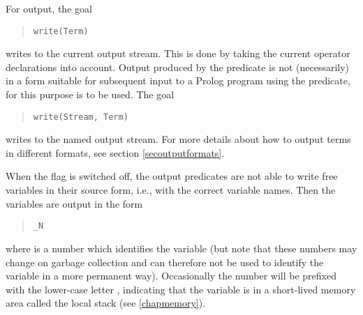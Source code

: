 For output, the goal
\begin{quote}
\begin{verbatim}
write(Term)
\end{verbatim}
\end{quote}
writes  to the current output stream.
This is done by taking the current operator declarations into account. Output
produced by the
%
predicate is not (necessarily) in
a form suitable for subsequent input to a Prolog program using the
predicate, for this purpose
%
is to be used.
The goal
\begin{quote}
\begin{verbatim}
write(Stream, Term)
\end{verbatim}
\end{quote}
writes  to the named output stream.
For more details about how to output terms in different formats, see
section \ref{secoutputformats}.



When the flag  is switched off,
the output predicates are not able to write free variables
in their source form, i.e., with the correct variable names.
Then the variables are output in the form
\begin{quote}
\begin{verbatim}
_N
\end{verbatim}
\end{quote}
where  is a number which identifies the variable (but note that these
numbers may change on garbage collection and can therefore not be used to
identify the variable in a more permanent way).
Occasionally the number will be prefixed with the lower-case letter
,
indicating that the variable is in a short-lived memory area called the
local stack (see \ref{chapmemory}).%

